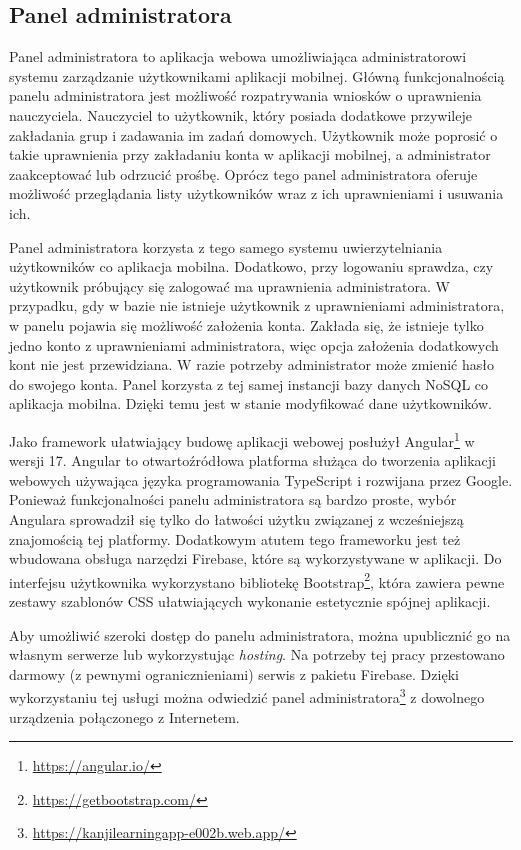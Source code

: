 \documentclass[a4paper,twoside,12pt]{book}
\newcommand{\obcy}[1]{\emph{#1}}
\newcommand{\english}[1]{{\selectlanguage{british}\obcy{#1}}}
\begin{document}
\subsection{Panel administratora}
Panel administratora to aplikacja webowa umożliwiająca administratorowi systemu zarządzanie użytkownikami aplikacji mobilnej. Główną funkcjonalnością panelu administratora jest możliwość rozpatrywania wniosków o uprawnienia nauczyciela. Nauczyciel to użytkownik, który posiada dodatkowe przywileje zakładania grup i zadawania im zadań domowych. Użytkownik może poprosić o takie uprawnienia przy zakładaniu konta w aplikacji mobilnej, a administrator zaakceptować lub odrzucić prośbę. Oprócz tego panel administratora oferuje możliwość przeglądania listy użytkowników wraz z ich uprawnieniami i usuwania ich.

Panel administratora korzysta z tego samego systemu uwierzytelniania użytkowników co aplikacja mobilna. Dodatkowo, przy logowaniu sprawdza, czy użytkownik próbujący się zalogować ma uprawnienia administratora. W przypadku, gdy w bazie nie istnieje użytkownik z uprawnieniami administratora, w panelu pojawia się możliwość założenia konta. Zakłada się, że istnieje tylko jedno konto z uprawnieniami administratora, więc opcja założenia dodatkowych kont nie jest przewidziana. W razie potrzeby administrator może zmienić hasło do swojego konta. Panel korzysta z tej samej instancji bazy danych NoSQL co aplikacja mobilna. Dzięki temu jest w stanie modyfikować dane użytkowników. 

Jako framework ułatwiający budowę aplikacji webowej posłużył Angular\footnote{\url{https://angular.io/}} w wersji 17. Angular to otwartoźródłowa platforma służąca do tworzenia aplikacji webowych używająca języka programowania TypeScript i rozwijana przez Google. Ponieważ funkcjonalności panelu administratora są bardzo proste, wybór Angulara sprowadził się tylko do łatwości użytku związanej z wcześniejszą znajomością tej platformy. Dodatkowym atutem tego frameworku jest też wbudowana obsługa narzędzi Firebase, które są wykorzystywane w aplikacji. Do interfejsu użytkownika wykorzystano bibliotekę Bootstrap\footnote{\url{https://getbootstrap.com/}}, która zawiera pewne zestawy szablonów CSS ułatwiających wykonanie estetycznie spójnej aplikacji.

Aby umożliwić szeroki dostęp do panelu administratora, można upublicznić go na własnym serwerze lub wykorzystując \english{hosting}. Na potrzeby tej pracy przestowano darmowy (z pewnymi ogranicznieniami) serwis z pakietu Firebase. Dzięki wykorzystaniu tej usługi można odwiedzić panel administratora\footnote{\url{https://kanjilearningapp-e002b.web.app/}} z dowolnego urządzenia połączonego  z Internetem.
\end{document}
